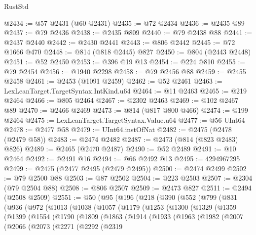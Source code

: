 \begin{lexlean}{RustStd}
\begin{coremodule}
@2434 := @57 @2431 (@60 @2431)
@2435 := @72 @2434
@2436 := @2435 @89
@2437 := @79 @2436
@2438 := @2435 @809
@2440 := @79 @2438 @88
@2441 := @2437 @2440
@2442 := @2430 @2441
@2443 := @806 @2442
@2445 := @72 @1666 @470
@2448 := @814 (@818 @2445) @827
@2450 := @804 (@2443 @2448)
@2451 := @52 @2450
@2453 := @396 @19 @13
@2454 := @224 @810
@2455 := @79 @2454
@2456 := @1940 @2298
@2458 := @79 @2456 @88
@2459 := @2455 @2458
@2461 := @2453 (@1091 @2459)
@2462 := @52 @2461
@2463 := LexLeanTarget.TargetSyntax.IntKind.u64
@2464 := @11 @2463
@2465 := @219 @2464
@2466 := @805 @2464
@2467 := @2302 @2463
@2469 := @102 @2467 @89
@2470 := @2466 @2469
@2473 := @814 (@817 @800 @466)
@2474 := @199 @2464
@2475 := LexLeanTarget.TargetSyntax.Value.u64
@2477 := @56 UInt64
@2478 := @2477 @58
@2479 := UInt64.instOfNat
@2482 := @2475 (@2478 (@2479 @58))
@2483 := @2474 @2482
@2487 := @2473 (@814 (@823 @2483) @826)
@2489 := @2465 (@2470 @2487)
@2490 := @52 @2489
@2491 := @10 @2464
@2492 := @2491 @16
@2494 := @66 @2492 @13
@2495 := 4294967295
@2499 := @2475 (@2477 @2495 (@2479 @2495))
@2500 := @2474 @2499
@2502 := @79 @2500 @88
@2503 := @87 @2502
@2504 := @223 @2503
@2507 := @2304 (@79 @2504 @88)
@2508 := @806 @2507
@2509 := @2473 @827
@2511 := @2494 (@2508 @2509)
@2551 := @50
    (@95
      (@196
        (@218
          (@390
            (@552
              (@799
                (@831
                  (@936
                    (@972
                      (@1013
                        (@1038
                          (@1057
                            (@1179
                              (@1253
                                (@1300
                                  (@1329
                                    (@1359
                                      (@1399
                                        (@1554
                                          (@1790
                                            (@1809
                                              (@1863
                                                (@1914
                                                  (@1933
                                                    (@1963
                                                      (@1982
                                                        (@2007
                                                          (@2066
                                                            (@2073
                                                              (@2271
                                                                (@2292
                                                                  (@2319

\end{coremodule}
\end{lexlean}
